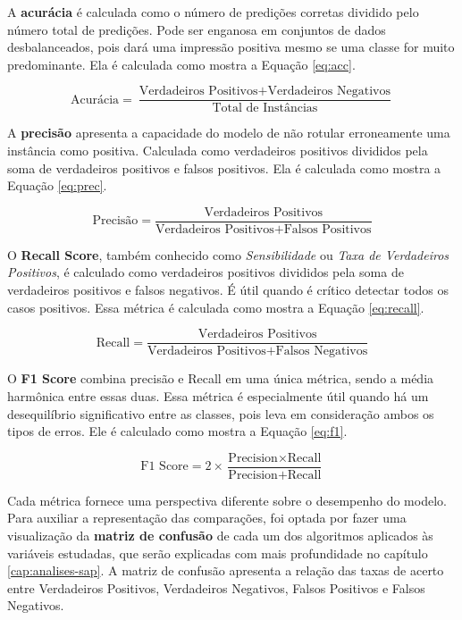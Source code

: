 A \textbf{acurácia} é calculada como o número de predições corretas dividido pelo número total de predições. Pode ser enganosa em conjuntos de dados desbalanceados, pois dará uma impressão positiva mesmo se uma classe for muito predominante. Ela é calculada como mostra a Equação \ref{eq:acc}.

\begin{equation}
    \text{Acurácia} = \frac{\text{Verdadeiros Positivos} + \text{Verdadeiros Negativos}}{\text{Total de Instâncias}}
    \label{eq:acc}
\end{equation}

A \textbf{precisão} apresenta a capacidade do modelo de não rotular erroneamente uma instância como positiva. Calculada como verdadeiros positivos divididos pela soma de verdadeiros positivos e falsos positivos. Ela é calculada como mostra a Equação \ref{eq:prec}.

\begin{equation}
    \text{Precisão} = \frac{\text{Verdadeiros Positivos}}{\text{Verdadeiros Positivos} + \text{Falsos Positivos}}
    \label{eq:prec}
\end{equation}

O \textbf{Recall Score}, também conhecido como \textit{Sensibilidade} ou \textit{Taxa de Verdadeiros Positivos}, é calculado como verdadeiros positivos divididos pela soma de verdadeiros positivos e falsos negativos. É útil quando é crítico detectar todos os casos positivos. Essa métrica é calculada como mostra a Equação \ref{eq:recall}.

\begin{equation}
    \text{Recall} = \frac{\text{Verdadeiros Positivos}}{\text{Verdadeiros Positivos} + \text{Falsos Negativos}}
    \label{eq:recall}
\end{equation}

O \textbf{F1 Score} combina precisão e Recall em uma única métrica, sendo a média harmônica entre essas duas. Essa métrica é especialmente útil quando há um desequilíbrio significativo entre as classes, pois leva em consideração ambos os tipos de erros. Ele é calculado como mostra a Equação \ref{eq:f1}.

\begin{equation}
    \text{F1 Score} = 2 \times \frac{\text{Precision} \times \text{Recall}}{\text{Precision} + \text{Recall}}
    \label{eq:f1}
\end{equation}

Cada métrica fornece uma perspectiva diferente sobre o desempenho do modelo. Para auxiliar a representação das comparações, foi optada por fazer uma visualização da \textbf{matriz de confusão} de cada um dos algoritmos aplicados às variáveis estudadas, que serão explicadas com mais profundidade no capítulo \ref{cap:analises-sap}. A matriz de confusão apresenta a relação das taxas de acerto entre Verdadeiros Positivos, Verdadeiros Negativos, Falsos Positivos e Falsos Negativos.

